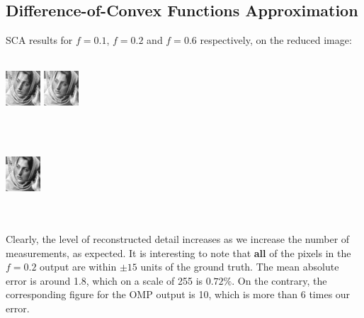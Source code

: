 \documentclass[letterpaper, 10 pt, conference]{article}
\begin{document}
\subsection{Difference-of-Convex Functions Approximation}
SCA results for $f=0.1$, $f=0.2$ and $f=0.6$ respectively, on the reduced image: \\ \\
\centerline{\includegraphics[scale=2.6]{out-sca-10p} \includegraphics[scale=2.6]{out-sca-20p}} \\ \\
\centerline{ \includegraphics[scale=2.6]{out-sca-60p}} \\ \\
Clearly, the level of reconstructed detail increases as we increase the number of measurements, as expected. It is interesting to note that \textbf{all} of the pixels in the $f=0.2$ output are within $\pm 15$ units of the ground truth. The mean absolute error is around 1.8, which on a scale of 255 is $0.72\%$. On the contrary, the corresponding figure for the OMP output is 10, which is more than 6 times our error.
\end{document}
